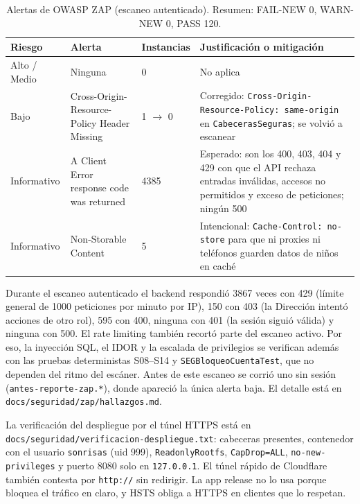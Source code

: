 \begin{table}[H]
\centering\small
\begin{tabular}{p{2.4cm}p{6.2cm}p{1.6cm}p{4.6cm}}
\toprule
\textbf{Riesgo} & \textbf{Alerta} & \textbf{Instancias} & \textbf{Justificación o mitigación}\\\midrule
Alto / Medio & Ninguna & 0 & No aplica\\
Bajo & Cross-Origin-Resource-Policy Header Missing & 1 $\rightarrow$ 0 & Corregido: \texttt{Cross-Origin-Resource-Policy: same-origin} en \texttt{CabecerasSeguras}; se volvió a escanear\\
Informativo & A Client Error response code was returned & 4385 & Esperado: son los 400, 403, 404 y 429 con que el API rechaza entradas inválidas, accesos no permitidos y exceso de peticiones; ningún 500\\
Informativo & Non-Storable Content & 5 & Intencional: \texttt{Cache-Control: no-store} para que ni proxies ni teléfonos guarden datos de niños en caché\\
\bottomrule
\end{tabular}
\caption{Alertas de OWASP ZAP (escaneo autenticado). Resumen: FAIL-NEW 0, WARN-NEW 0, PASS 120.}
\end{table}

Durante el escaneo autenticado el backend respondió 3867 veces con 429 (límite general de 1000 peticiones por minuto por IP), 150 con 403 (la Dirección intentó acciones de otro rol), 595 con 400, ninguna con 401 (la sesión siguió válida) y ninguna con 500. El rate limiting también recortó parte del escaneo activo. Por eso, la inyección SQL, el IDOR y la escalada de privilegios se verifican además con las pruebas deterministas S08--S14 y \texttt{SEGBloqueoCuentaTest}, que no dependen del ritmo del escáner. Antes de este escaneo se corrió uno sin sesión (\texttt{antes-reporte-zap.*}), donde apareció la única alerta baja. El detalle está en \texttt{docs/seguridad/zap/hallazgos.md}.

La verificación del despliegue por el túnel HTTPS está en \texttt{docs/seguridad/verificacion-despliegue.txt}: cabeceras presentes, contenedor con el usuario \texttt{sonrisas} (uid 999), \texttt{ReadonlyRootfs}, \texttt{CapDrop=ALL}, \texttt{no-new-privileges} y puerto 8080 solo en \texttt{127.0.0.1}. El túnel rápido de Cloudflare también contesta por \texttt{http://} sin redirigir. La app release no lo usa porque bloquea el tráfico en claro, y HSTS obliga a HTTPS en clientes que lo respetan.
